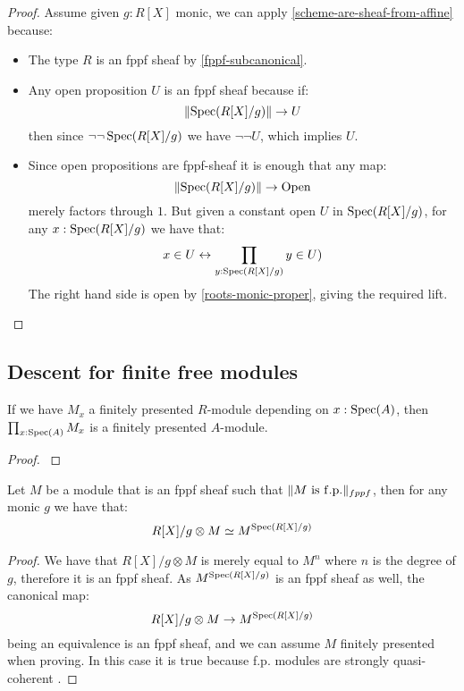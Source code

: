 \begin{proof}
Assume given $g:R[X]$ monic, we can apply \cref{scheme-are-sheaf-from-affine} because:
\begin{itemize}
\item The type $R$ is an fppf sheaf by \cref{fppf-subcanonical}.
\item Any open proposition $U$ is an fppf sheaf because if:
\[\lVert \operatorname{Spec}(R[X]/g) \rVert\to U\]
then since $\neg\neg\operatorname{Spec}(R[X]/g)$ we have $\neg\neg U$, which implies $U$.
\item Since open propositions are fppf-sheaf it is enough that any map:
\[\lVert \operatorname{Spec}(R[X]/g) \rVert\to \mathrm{Open}\]
merely factors through $1$. But given a constant open $U$ in $\operatorname{Spec}(R[X]/g)$, for any $x:\operatorname{Spec}(R[X]/g)$ we have that:
\[x\in U \leftrightarrow \prod_{y:\operatorname{Spec}(R[X]/g)} y\in U)\]
The right hand side is open by \cref{roots-monic-proper}, giving the required lift. 
\end{itemize}
\end{proof}


\subsection{Descent for finite free modules}

\begin{lemma}\label{fp-equivalent-pointwise}
If we have $M_x$ a finitely presented $R$-module depending on $x:\operatorname{Spec}(A)$, then $\prod_{x:\operatorname{Spec}(A)}M_x$ is a finitely presented $A$-module.
\end{lemma}

\begin{proof}
\cite{TODO}
\end{proof}

\begin{lemma}\label{descent-sqc-fppf}
Let $M$ be a module that is an fppf sheaf such that $\lVert M\ \mathrm{is\ f.p.} \rVert_{fppf}$, then for any monic $g$ we have that:
\[R[X]/g\otimes M \simeq M^{\operatorname{Spec}(R[X]/g)}\]
\end{lemma}

\begin{proof}
We have that $R[X]/g\otimes M$ is merely equal to $M^n$ where $n$ is the degree of $g$, therefore it is an fppf sheaf. As $M^{\operatorname{Spec}(R[X]/g)}$ is an fppf sheaf as well, the canonical map:
\[R[X]/g\otimes M \to M^{\operatorname{Spec}(R[X]/g)}\]
being an equivalence is an fppf sheaf, and we can assume $M$ finitely presented when proving. In this case it is true because f.p. modules are strongly quasi-coherent \cite{TODO}.
\end{proof}

